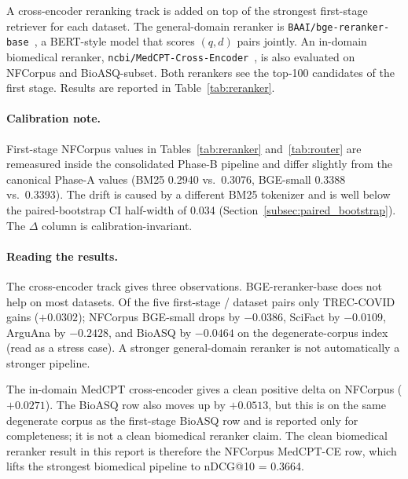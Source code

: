 \documentclass[11pt,a4paper]{article}
\begin{document}
A cross-encoder reranking track is added on top of the strongest
first-stage retriever for each dataset. The general-domain reranker is
\texttt{BAAI/bge-reranker-base}~\cite{Xiao2023BGE}, a BERT-style model
that scores $(q, d)$ pairs jointly. An in-domain biomedical reranker,
\texttt{ncbi/MedCPT-Cross-Encoder}~\cite{Jin2023MedCPT}, is also
evaluated on NFCorpus and BioASQ-subset. Both rerankers see the
top-100 candidates of the first stage. Results are reported in
Table~\ref{tab:reranker}.

\begin{table}[ht]
    \centering
    \caption{Cross-encoder (BGE-reranker-base) and biomedical
    cross-encoder (MedCPT-CE) reranking over first-stage top-100
    candidates. The first-stage column reuses the strongest single
    retriever from Section~\ref{subsec:multi}; the Delta column is the
    change in mean nDCG@10 with respect to the first stage.}
    \label{tab:reranker}
    \small
    
\end{table}

\paragraph{Calibration note.}
First-stage NFCorpus values in Tables~\ref{tab:reranker}
and~\ref{tab:router} are remeasured inside the consolidated Phase-B
pipeline and differ slightly from the canonical Phase-A values
(BM25 0.2940 vs.\ 0.3076, BGE-small 0.3388 vs.\ 0.3393). The drift is
caused by a different BM25 tokenizer and is well below the
paired-bootstrap CI half-width of 0.034
(Section~\ref{subsec:paired_bootstrap}). The $\Delta$ column is
calibration-invariant.

\paragraph{Reading the results.}
The cross-encoder track gives three observations. BGE-reranker-base
does not help on most datasets. Of the five first-stage / dataset
pairs only TREC-COVID gains ($+0.0302$); NFCorpus BGE-small drops by
$-0.0386$, SciFact by $-0.0109$, ArguAna by $-0.2428$, and BioASQ by
$-0.0464$ on the degenerate-corpus index (read as a stress case).
A stronger general-domain reranker is not automatically a stronger
pipeline.

The in-domain MedCPT cross-encoder gives a clean positive delta on
NFCorpus ($+0.0271$). The BioASQ row also moves up by $+0.0513$, but
this is on the same degenerate corpus as the first-stage BioASQ row
and is reported only for completeness; it is not a clean biomedical
reranker claim. The clean biomedical reranker result in this report is
therefore the NFCorpus MedCPT-CE row, which lifts the strongest
biomedical pipeline to nDCG@10 = 0.3664.
\end{document}
